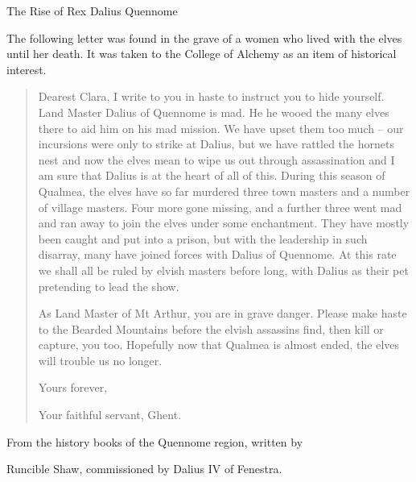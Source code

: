 The Rise of Rex Dalius Quennome\label{h_dalius}

The following letter was found in the grave of a women who lived with the elves until her death.  It was taken to the College of Alchemy as an item of historical interest.

\begin{quotation}
Dearest Clara, I write to you in haste to instruct you to hide yourself.  Land Master Dalius of Quennome is mad.  He he wooed the many elves there to aid him on his mad mission.  We have upset them too much -- our incursions were only to strike at Dalius, but we have rattled the hornets nest and now the elves mean to wipe us out through assassination and I am sure that Dalius is at the heart of all of this.  During this season of Qualmea, the elves have so far murdered three town masters and a number of village masters.  Four more gone missing, and a further three went mad and ran away to join the elves under some enchantment.  They have mostly been caught and put into a prison, but with the leadership in such disarray, many have joined forces with Dalius of Quennome.  At this rate we shall all be ruled by elvish masters before long, with Dalius as their pet pretending to lead the show.

	As Land Master of Mt Arthur, you are in grave danger.  Please make haste to the Bearded Mountains before the elvish assassins find, then kill or capture, you too.  Hopefully now that Qualmea is almost ended, the elves will trouble us no longer.

	Yours forever,

	Your faithful servant, Ghent.

\end{quotation}

From the history books of the Quennome region, written by

 Runcible Shaw, commissioned by Dalius IV of Fenestra.

